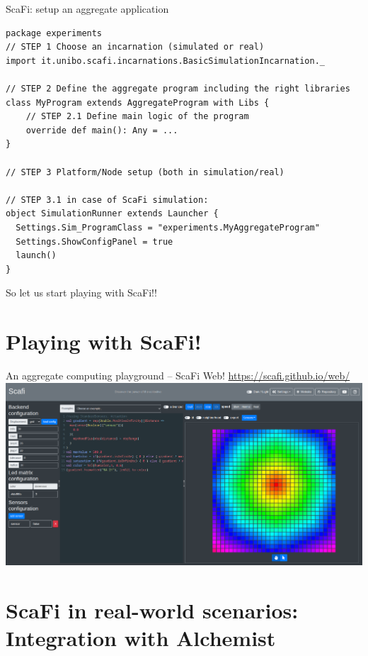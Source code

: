 \documentclass[presentation, 8pt]{beamer}\mode<presentation>{\usetheme{AMSBolognaFC}}
\begin{document}
\begin{frame}[fragile]{ScaFi: setup an aggregate application}

\begin{verbatim}
package experiments
// STEP 1 Choose an incarnation (simulated or real)
import it.unibo.scafi.incarnations.BasicSimulationIncarnation._

// STEP 2 Define the aggregate program including the right libraries
class MyProgram extends AggregateProgram with Libs {
	// STEP 2.1 Define main logic of the program
	override def main(): Any = ...
}

// STEP 3 Platform/Node setup (both in simulation/real)

// STEP 3.1 in case of ScaFi simulation:
object SimulationRunner extends Launcher {
  Settings.Sim_ProgramClass = "experiments.MyAggregateProgram"
  Settings.ShowConfigPanel = true
  launch()
}
\end{verbatim}
\begin{center}
{\huge So let us start playing with ScaFi!! \bold{\faSmileO}}
\end{center}
\end{frame}
\section{Playing with ScaFi!}

\begin{frame}{An aggregate computing playground -- ScaFi Web!}
\centering
\url{https://scafi.github.io/web/}
\includegraphics[width=\textwidth]{img/gradient-web.png}
\end{frame}
\section{ScaFi in real-world scenarios: Integration with Alchemist}
\end{document}
